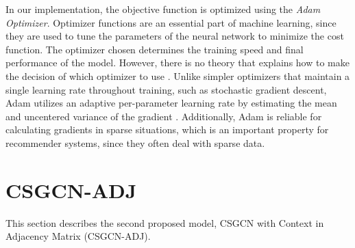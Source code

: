 In our implementation, the objective function is optimized using the \textit{Adam Optimizer}\cite{AdamOptimizer}.
Optimizer functions are an essential part of machine learning, since they are used to tune the parameters of the neural network to minimize the cost function.
The optimizer chosen determines the training speed and final performance of the model.
However, there is no theory that explains how to make the decision of which optimizer to use \cite{EmpiricalOptimizers}.
Unlike simpler optimizers that maintain a single learning rate throughout training,  such as stochastic gradient descent, Adam utilizes an adaptive per-parameter learning rate by estimating the mean and uncentered variance of the gradient \cite{AdamOptimizer}.
Additionally, Adam is reliable for calculating gradients in sparse situations, which is an important property for recommender systems, since they often deal with sparse data.






\section{CSGCN-ADJ}\label{sec:csgcn_adj}
This section describes the second proposed model, CSGCN with Context in Adjacency Matrix (CSGCN-ADJ).

